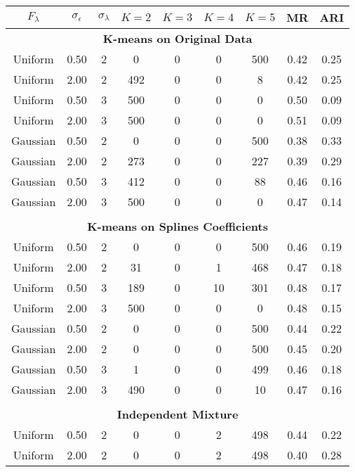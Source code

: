 \begin{table}[ht]
\begin{center}
\begin{tabular}{ccc|cccccc}
  \thickhline  $F_{\lambda}$&$\sigma_{\epsilon}$&$\sigma_{\lambda}$&$K=2$&$K=3$&$K=4$&$K=5$&MR&ARI\\ \hline\multicolumn{9}{c}{\textbf{K-means on Original Data}}\\ Uniform & 0.50 &   2 &   0 &   0 &   0 & 500 & 0.42 & 0.25 \\ 
  Uniform & 2.00 &   2 & 492 &   0 &   0 &   8 & 0.42 & 0.25 \\ 
  Uniform & 0.50 &   3 & 500 &   0 &   0 &   0 & 0.50 & 0.09 \\ 
  Uniform & 2.00 &   3 & 500 &   0 &   0 &   0 & 0.51 & 0.09 \\ 
  Gaussian & 0.50 &   2 &   0 &   0 &   0 & 500 & 0.38 & 0.33 \\ 
  Gaussian & 2.00 &   2 & 273 &   0 &   0 & 227 & 0.39 & 0.29 \\ 
  Gaussian & 0.50 &   3 & 412 &   0 &   0 &  88 & 0.46 & 0.16 \\ 
  Gaussian & 2.00 &   3 & 500 &   0 &   0 &   0 & 0.47 & 0.14 \\ 
   \\ \multicolumn{9}{c}{\textbf{K-means on Splines Coefficients}}\\Uniform & 0.50 &   2 &   0 &   0 &   0 & 500 & 0.46 & 0.19 \\ 
  Uniform & 2.00 &   2 &  31 &   0 &   1 & 468 & 0.47 & 0.18 \\ 
  Uniform & 0.50 &   3 & 189 &   0 &  10 & 301 & 0.48 & 0.17 \\ 
  Uniform & 2.00 &   3 & 500 &   0 &   0 &   0 & 0.48 & 0.15 \\ 
  Gaussian & 0.50 &   2 &   0 &   0 &   0 & 500 & 0.44 & 0.22 \\ 
  Gaussian & 2.00 &   2 &   0 &   0 &   0 & 500 & 0.45 & 0.20 \\ 
  Gaussian & 0.50 &   3 &   1 &   0 &   0 & 499 & 0.46 & 0.18 \\ 
  Gaussian & 2.00 &   3 & 490 &   0 &   0 &  10 & 0.47 & 0.16 \\ 
   \\ \multicolumn{9}{c}{\textbf{Independent Mixture}}\\Uniform & 0.50 &   2 &   0 &   0 &   2 & 498 & 0.44 & 0.22 \\ 
  Uniform & 2.00 &   2 &   0 &   0 &   2 & 498 & 0.40 & 0.28 \\ 

\end{tabular}
\end{center}
\end{table}
